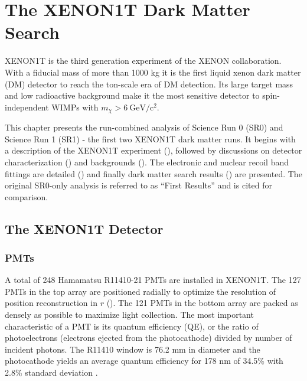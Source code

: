

\pagestyle{cu}
\graphicspath{{./Chapter3/Figures/}}
\chapter[The XENON1T Dark Matter Search][The XENON1T Dark Matter Search]{The XENON1T Dark Matter Search}
\label{chap:xenon1t}



XENON1T is the third generation experiment of the XENON collaboration.  With a fiducial mass of more than 1000 kg it is the first
liquid xenon dark matter (DM) detector to reach the ton-scale era of DM detection.  Its large target mass and low radioactive background
make it the most sensitive detector to spin-independent WIMPs with $m_{\chi} > 6\ \mathrm{GeV / c^2}$.

This chapter presents the run-combined analysis of Science Run 0 (SR0) and Science Run 1 (SR1) - the first two XENON1T dark matter
runs.  It begins with a description of the XENON1T experiment (), followed by discussions on detector
characterization () and backgrounds
().  The electronic and nuclear recoil band fittings are
detailed () and finally dark matter search results () are
presented.  The original SR0-only analysis  is referred to as ``First Results'' and is cited for comparison.

\section{The XENON1T Detector}
\label{sec:xenon1t_detector}




\subsection{PMTs}
\label{subsec:xenon1t_pmts}
A total of 248 Hamamatsu R11410-21 PMTs are installed in XENON1T.  The 127 PMTs in the top array are positioned radially to
optimize the resolution of position reconstruction in $r$ ().  The 121 PMTs in the bottom
array are packed as densely as possible to maximize light collection.  The most important characteristic of a PMT is its quantum
efficiency
(QE), or the ratio of photoelectrons (electrons ejected from the photocathode) divided by number of incident photons.  The R11410 window is
76.2 mm in diameter and the photocathode yields an average quantum efficiency for 178 nm of 34.5\% with 2.8\%
standard deviation .

